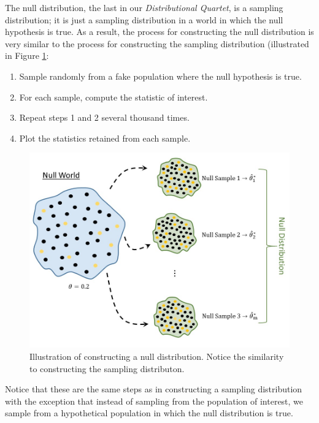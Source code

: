 \documentclass[
]{book}
\providecommand{\tightlist}{%
  \setlength{\itemsep}{0pt}\setlength{\parskip}{0pt}}
\theoremstyle{plain}
\theoremstyle{mydefn}
\theoremstyle{myexmpl}
\theoremstyle{remark}
\begin{document}
The null distribution, the last in our \emph{Distributional Quartet}, is a sampling distribution; it is just a sampling distribution in a world in which the null hypothesis is true. As a result, the process for constructing the null distribution is very similar to the process for constructing the sampling distribution (illustrated in Figure \ref{fig:nulldistns-null-distribution}:

\begin{enumerate}
\def\labelenumi{\arabic{enumi}.}
\tightlist
\item
  Sample randomly from a fake population where the null hypothesis is true.
\item
  For each sample, compute the statistic of interest.
\item
  Repeat steps 1 and 2 several thousand times.
\item
  Plot the statistics retained from each sample.
\end{enumerate}

\begin{figure}

{\centering \includegraphics[width=0.8\linewidth]{./images/NullDistns-Null-Distribution} 

}

\caption{Illustration of constructing a null distribution.  Notice the similarity to constructing the sampling distributon.}\label{fig:nulldistns-null-distribution}
\end{figure}

Notice that these are the same steps as in constructing a sampling distribution with the exception that instead of sampling from the population of interest, we sample from a hypothetical population in which the null distribution is true.
\end{document}
